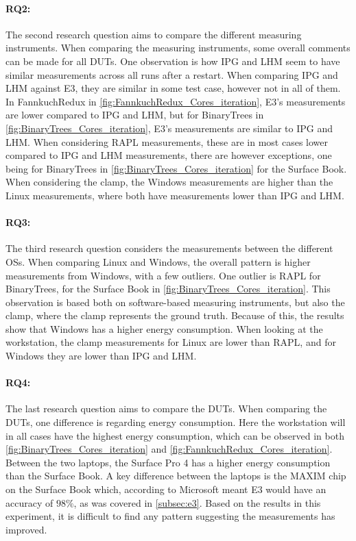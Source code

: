 \paragraph*{RQ2:} The second research question aims to compare the different measuring instruments. When comparing the measuring instruments, some overall comments can be made for all DUTs. One observation is how IPG and LHM seem to have similar measurements across all runs after a restart. When comparing IPG and LHM against E3, they are similar in some test case, however not in all of them. In FannkuchRedux in \cref{fig:FannkuchRedux_Cores_iteration}, E3's measurements are lower compared to IPG and LHM, but for BinaryTrees in \cref{fig:BinaryTrees_Cores_iteration}, E3's measurements are similar to IPG and LHM. When considering RAPL measurements, these are in most cases lower compared to IPG and LHM measurements, there are however exceptions, one being for BinaryTrees in \cref{fig:BinaryTrees_Cores_iteration} for the Surface Book. When considering the clamp, the Windows measurements are higher than the Linux measurements, where both have measurements lower than IPG and LHM. 



\paragraph*{RQ3:} The third research question considers the measurements between the different OSs. When comparing Linux and Windows, the overall pattern is higher measurements from Windows, with a few outliers. One outlier is RAPL for BinaryTrees, for the Surface Book in \cref{fig:BinaryTrees_Cores_iteration}. This observation is based both on software-based measuring instruments, but also the clamp, where the clamp represents the ground truth. Because of this, the results show that Windows has a higher energy consumption. When looking at the workstation, the clamp measurements for Linux are lower than RAPL, and for Windows they are lower than IPG and LHM.

\paragraph*{RQ4:} The last research question aims to compare the DUTs. When comparing the DUTs, one difference is regarding energy consumption. Here the workstation will in all cases have the highest energy consumption, which can be observed in both \cref*{fig:BinaryTrees_Cores_iteration} and \cref*{fig:FannkuchRedux_Cores_iteration}. Between the two laptops, the Surface Pro 4 has a higher energy consumption than the Surface Book. A key difference between the laptops is the MAXIM chip on the Surface Book which, according to Microsoft meant E3 would have an accuracy of $98\%$\cite{E3WinHec}, as was covered in \cref*{subsec:e3}. Based on the results in this experiment, it is difficult to find any pattern suggesting the measurements has improved.
